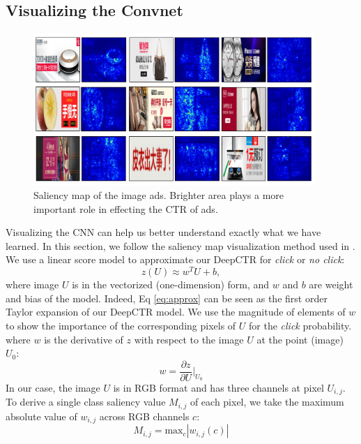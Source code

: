 \documentclass{sig-alternate}
\begin{document}
\subsection{Visualizing the Convnet}
\begin{figure}
	\centering
	\includegraphics[width=0.95\textwidth]{vis}
	\caption{Saliency map of the image ads. Brighter area plays a more important role in effecting the CTR of ads.}
	\label{fig:vis}
\end{figure}
Visualizing the CNN can help us better understand exactly what we have learned. In this section, we follow the saliency map visualization method used in \cite{simonyan2013deep}. We use a linear score model to approximate our DeepCTR for \emph{click} or \emph{no click}:
\begin{equation}\label{eq:approx}
z(U) \approx w^{T}U + b, 
\end{equation}
where image $U$ is in the vectorized (one-dimension) form, and $w$ and $b$ are weight and bias of the model. Indeed, Eq \ref{eq:approx} can be seen as the first order Taylor expansion of our DeepCTR model. We use the magnitude
of elements of $w$ to show the importance of the corresponding pixels of $U$ for the \emph{click} probability. where $w$ is the derivative of $z$ with respect to the image $U$ at the point (image) $U_{0}$:
\begin{equation}
w  = \frac{\partial z}{\partial U} \Big|_{U_{0}}
\end{equation}
In our case, the image $U$ is in RGB format and has three channels at pixel $U_{i,j}$. To derive a single class saliency value $M_{i,j}$ of each pixel, we take the maximum  absolute value of $w_{i,j}$ across RGB channels $c$: 
\begin{equation}
M_{i,j} = \text{max}_{c} |w_{i,j}(c)|
\end{equation}
\end{document}
